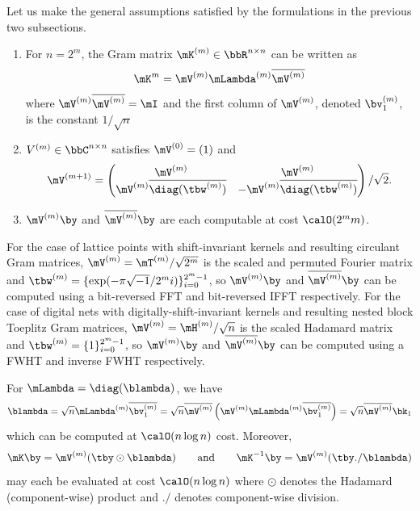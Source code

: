 \documentclass[acmsmall]{acmart}
\begin{document}
Let us make the general assumptions satisfied by the formulations in the previous two subsections. 
\begin{enumerate}
    \item For $n=2^m$, the Gram matrix $\mK^{(m)} \in \bbR^{n \times n}$ can be written as
    $$\mK^{m} = \mV^{(m)} \mLambda^{(m)} \overline{\mV^{(m)}}$$
    where $\mV^{(m)} \overline{\mV^{(m)}} = \mI$ and the first column of $\mV^{(m)}$, denoted $\bv_1^{(m)}$, is the constant $1/\sqrt{n}$
    \item $V^{(m)} \in \bbC^{n \times n}$ satisfies $\mV^{(0)} = (1)$ and 
    $$\mV^{(m+1)} = \begin{pmatrix} \mV^{(m)} & \mV^{(m)} \\  \mV^{(m)} \overline{\diag(\tbw^{(m)})} & - \mV^{(m)} \overline{\diag(\tbw^{(m)})} \end{pmatrix}/\sqrt{2}.$$
    \item $\mV^{(m)} \by$ and $\overline{\mV^{(m)}} \by$ are each computable at cost $\calO(2^mm)$.
\end{enumerate}
For the case of lattice points with shift-invariant kernels and resulting circulant Gram matrices, $\mV^{(m)} = \mT^{(m)}/\sqrt{2^m}$ is the scaled and permuted Fourier matrix and $\tbw^{(m)} = \{\exp(-\pi \sqrt{-1}/2^m i)\}_{i=0}^{2^m-1}$, so $\mV^{(m)} \by$ and $\overline{\mV^{(m)}} \by$ can be computed using a bit-reversed FFT and bit-reversed IFFT respectively. For the case of digital nets with 
digitally-shift-invariant kernels  and resulting nested block Toeplitz Gram matrices, $\mV^{(m)} = \mH^{(m)}/\sqrt{n}$ is the scaled Hadamard matrix and $\tbw^{(m)} = \{1\}_{i=0}^{2^m-1}$, so $\mV^{(m)} \by$ and $\overline{\mV^{(m)}} \by$ can be computed using a FWHT and inverse FWHT respectively. 

For $\mLambda = \diag(\blambda)$, we have 
$$\blambda = \sqrt{n} \mLambda^{(m)}\overline{\bv_1^{(m)}} = \sqrt{n} \overline{\mV^{(m)}} \left(\mV^{(m)} \mLambda^{(m)} \overline{\bv_1^{(m)}}\right) = \sqrt{n} \overline{\mV^{(m)}} \bk_1$$
which can be computed at $\calO(n \log n)$ cost. Moreover, 
\begin{equation*}
    \mK \by = \mV^{(m)}(\tby \odot \blambda) \qquad \text{and}\qquad \mK^{-1} \by = \mV^{(m)} (\tby ./ \blambda)
\end{equation*}
may each be evaluated at cost $\calO(n \log n)$ where $\odot$ denotes the Hadamard (component-wise) product and $./$ denotes component-wise division.
\end{document}
